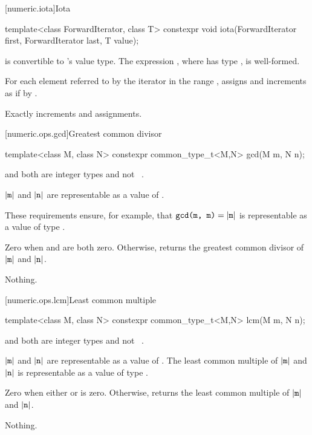 [numeric.iota]{Iota}

%
\begin{itemdecl}
template<class ForwardIterator, class T>
  constexpr void iota(ForwardIterator first, ForwardIterator last, T value);
\end{itemdecl}

\begin{itemdescr}
\pnum
\mandates
{} is convertible to 's value type.
The expression , where  has type ,
is well-formed.

\pnum
\effects
For each element referred to by the iterator 
in the range ,
assigns  and increments 
as if by .

\pnum
\complexity
Exactly  increments and assignments.
\end{itemdescr}

[numeric.ops.gcd]{Greatest common divisor}

%
\begin{itemdecl}
template<class M, class N>
  constexpr common_type_t<M,N> gcd(M m, N n);
\end{itemdecl}

\begin{itemdescr}
\pnum
\mandates
{} and  both are integer types and not
\cv{}~.

\pnum
\expects
$|\texttt{m}|$ and $|\texttt{n}|$
are representable as a value of .
\begin{note}
These requirements ensure, for example,
that $\texttt{gcd(m, m)} = |\texttt{m}|$
is representable as a value of type .
\end{note}


\pnum
\returns
Zero when  and  are both zero. Otherwise,
returns the greatest common divisor of $|\texttt{m}|$ and $|\texttt{n}|$.

\pnum
\throws
Nothing.
\end{itemdescr}

[numeric.ops.lcm]{Least common multiple}

%
\begin{itemdecl}
template<class M, class N>
  constexpr common_type_t<M,N> lcm(M m, N n);
\end{itemdecl}

\begin{itemdescr}
\pnum
\mandates
{} and  both are integer types and not
\cv{}~.

\pnum
\expects
$|\texttt{m}|$ and $|\texttt{n}|$
are representable as a value of .
The least common multiple of $|\texttt{m}|$ and $|\texttt{n}|$
is representable as a value of type .


\pnum
\returns
Zero when either  or  is zero.
Otherwise, returns the least common multiple of $|\texttt{m}|$ and $|\texttt{n}|$.

\pnum
\throws
Nothing.
\end{itemdescr}

